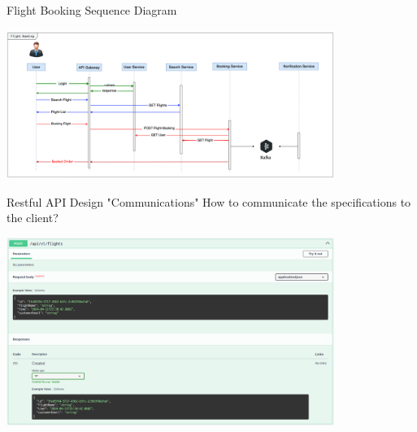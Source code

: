 \documentclass{beamer}
\begin{document}
\begin{frame}[t]{Flight Booking Sequence Diagram}
		\begin{center}
   			\includegraphics[width=0.8\textwidth, height=0.6\textheight]{img/flight-booking-sequence.png}
		\end{center}
\end{frame}

\begin{frame}[t]{Restful API Design "Communications"}
		\scriptsize	
		How to communicate the specifications to the client?

		\begin{center}
   			\includegraphics[width=0.8\textwidth, height=0.6\textheight]{img/swagger-doc.png}
		\end{center}		
	
\end{frame}
\end{document}
